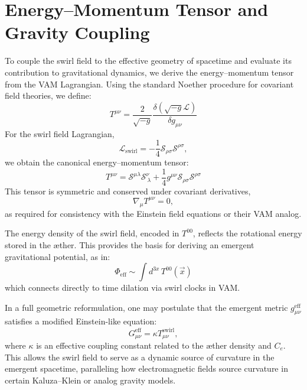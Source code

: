 \documentclass[a4paper,12pt]{article}
\begin{document}
    \section{Energy--Momentum Tensor and Gravity Coupling}
        To couple the swirl field to the effective geometry of spacetime and evaluate its contribution to gravitational dynamics, we derive the energy--momentum tensor from the VAM Lagrangian. Using the standard Noether procedure for covariant field theories, we define:
        \begin{equation}
            T^{\mu\nu} = \frac{2}{\sqrt{-g}} \frac{\delta (\sqrt{-g} \mathcal{L})}{\delta g_{\mu\nu}}
        \end{equation}
        For the swirl field Lagrangian,
        \begin{equation}
            \mathcal{L}_{\text{swirl}} = -\frac{1}{4} \mathcal{S}_{\rho\sigma} \mathcal{S}^{\rho\sigma},
        \end{equation}
        we obtain the canonical energy--momentum tensor:
        \begin{equation}
            T^{\mu\nu} = \mathcal{S}^{\mu\lambda} \mathcal{S}^\nu_{\ \lambda} + \frac{1}{4} g^{\mu\nu} \mathcal{S}_{\rho\sigma} \mathcal{S}^{\rho\sigma}
        \end{equation}
        This tensor is symmetric and conserved under covariant derivatives,
        \begin{equation}
            \nabla_\mu T^{\mu\nu} = 0,
        \end{equation}
        as required for consistency with the Einstein field equations or their VAM analog.

        The energy density of the swirl field, encoded in $T^{00}$, reflects the rotational energy stored in the æther. This provides the basis for deriving an emergent gravitational potential, as in:
        \begin{equation}
            \Phi_{\text{eff}} \sim \int d^{3x} \, T^{00}(\vec{x})
        \end{equation}
        which connects directly to time dilation via swirl clocks in VAM.

        In a full geometric reformulation, one may postulate that the emergent metric $g^{\text{eff}}_{\mu\nu}$ satisfies a modified Einstein-like equation:
        \begin{equation}
            G_{\mu\nu}^{\text{eff}} = \kappa T_{\mu\nu}^{\text{swirl}},
        \end{equation}
        where $\kappa$ is an effective coupling constant related to the æther density and $C_e$. This allows the swirl field to serve as a dynamic source of curvature in the emergent spacetime, paralleling how electromagnetic fields source curvature in certain Kaluza--Klein or analog gravity models.
\end{document}
